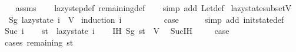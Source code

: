 \begin{isabellebody}
%
\isadelimproof
\ \ %
\endisadelimproof
%
\isatagproof
{}\isamarkupfalse%
\ assms\isanewline
\ \ \isamarkupfalse%
\ lazy{\isacharunderscore}{\kern0pt}step{\isacharunderscore}{\kern0pt}def\ remaining{\isacharunderscore}{\kern0pt}def\isanewline
\ \ \isamarkupfalse%
\ {\isacharparenleft}{\kern0pt}simp\ add{\isacharcolon}{\kern0pt}\ Let{\isacharunderscore}{\kern0pt}def{\isacharparenright}{\kern0pt}%
\endisatagproof
{\isafoldproof}%
%
\isadelimproof
\isanewline
%
\endisadelimproof
\isanewline
\isanewline
{}\isamarkupfalse%
\ lazy{\isacharunderscore}{\kern0pt}state{\isacharunderscore}{\kern0pt}subset{\isacharunderscore}{\kern0pt}V{\isacharcolon}{\kern0pt}\isanewline
\ \ {\isachardoublequoteopen}Sg\ {\isacharparenleft}{\kern0pt}lazy{\isacharunderscore}{\kern0pt}state\ i{\isacharparenright}{\kern0pt}\ {\isasymsubseteq}\ V{\isachardoublequoteclose}\isanewline
%
\isadelimproof
%
\endisadelimproof
%
\isatagproof
{}\isamarkupfalse%
\ {\isacharparenleft}{\kern0pt}induction\ i{\isacharparenright}{\kern0pt}\isanewline
\ \ \isamarkupfalse%
\ {}\isanewline
\ \ \isamarkupfalse%
\ \isamarkupfalse%
\ {\isacharquery}{\kern0pt}case\isanewline
\ \ \ \ \isamarkupfalse%
\ {\isacharparenleft}{\kern0pt}simp\ add{\isacharcolon}{\kern0pt}\ init{\isacharunderscore}{\kern0pt}state{\isacharunderscore}{\kern0pt}def{\isacharparenright}{\kern0pt}\isanewline
{}\isamarkupfalse%
\isanewline
\ \ \isamarkupfalse%
\ {\isacharparenleft}{\kern0pt}Suc\ i{\isacharparenright}{\kern0pt}\isanewline
\ \ \isamarkupfalse%
\ {\isacharquery}{\kern0pt}st\ {\isacharequal}{\kern0pt}\ {\isachardoublequoteopen}lazy{\isacharunderscore}{\kern0pt}state\ i{\isachardoublequoteclose}\isanewline
\ \ \isamarkupfalse%
\ IH{\isacharcolon}{\kern0pt}\ {\isachardoublequoteopen}Sg\ {\isacharquery}{\kern0pt}st\ {\isasymsubseteq}\ V{\isachardoublequoteclose}\ \isamarkupfalse%
\ Suc{\isachardot}{\kern0pt}IH\ \isakeywordONE{{\isachardot}{\kern0pt}}\isamarkupfalse%
\isanewline
\isanewline
\ \ \isamarkupfalse%
\ {\isacharquery}{\kern0pt}case\isanewline
\ \ \isamarkupfalse%
\ {\isacharparenleft}{\kern0pt}cases\ {\isachardoublequoteopen}remaining\ {\isacharquery}{\kern0pt}st\ {\isacharequal}{\kern0pt}\ {\isacharbraceleft}{\kern0pt}{\isacharbraceright}{\kern0pt}{\isachardoublequoteclose}{\isacharparenright}{\kern0pt}\isanewline

\end{isabellebody}
